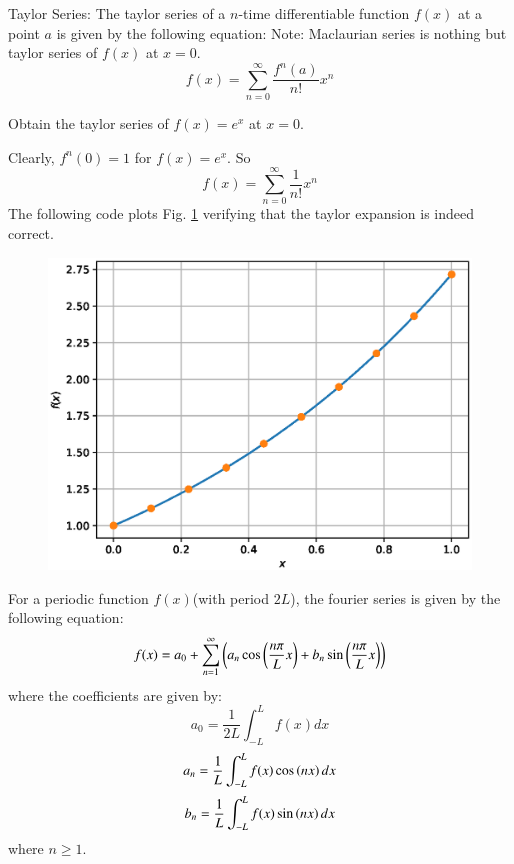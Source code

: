 \documentclass[journal,12pt,twocolumn]{IEEEtran}
\begin{document}
%
\begin{definition}
\label{Taylor Series}
Taylor Series:
The taylor series of a $n$-time differentiable function $f(x)$ at a point $a$ is given by the following equation:
Note: Maclaurian series is nothing but taylor series of $f(x)$ at $x=0$.
\begin{equation}
f(x)=\sum_{n=0}^{\infty} \frac{f^n(a)}{n!}x^n
\end{equation}
\end{definition}
\begin{problem}
Obtain the taylor series of $f(x) = e^x$ at $x=0$.
\end{problem}
\solution
Clearly, $f^n(0)=1$ for $f(x)=e^x$. So
\begin{equation}
f(x)=\sum_{n=0}^{\infty}\frac{1}{n!}x^n
\end{equation}
The following code plots  Fig. \ref{fig:2} verifying that the taylor expansion is indeed correct.

%
\begin{figure}[!ht]
\begin{center}
\includegraphics[width=\columnwidth]{./figs/3.eps}
\end{center}
\label{fig:2}	
\end{figure}



\begin{definition}
\label{Fourier Series}
For a periodic function $f(x)$(with period $2L$), the fourier series is given by the following equation:
\begin{equation}
f(x)=a_0+\sum_{n=1}^{\infty}\left(a_n\cos\left(\frac{n\pi}{L}x\right)+b_n\sin\left(\frac{n\pi}{L}x\right)\right)
\end{equation}
where the coefficients are given by:
\begin{equation}
a_0=\frac{1}{2L}\int_{-L}^{L}f(x)dx
\end{equation}
\begin{equation}
a_n=\frac{1}{L}\int_{-L}^{L}f(x)\cos\left(nx\right)dx
\end{equation}
\begin{equation}
b_n=\frac{1}{L}\int_{-L}^{L}f(x)\sin\left(nx\right)dx 
\end{equation}
where $n\ge1$. 
\end{definition}
\end{document}

